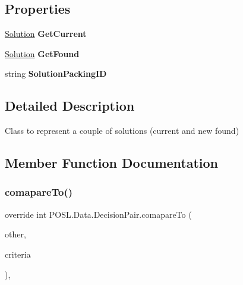 \subsection*{Properties}
\begin{DoxyCompactItemize}
\item 
\mbox{\label{classPOSL_1_1Data_1_1DecisionPair_a7757ed873d87b365b39f7ec3b203b428}} 
\hyperlink{classPOSL_1_1Data_1_1Solution}{Solution} {\bfseries Get\+Current}
\item 
\mbox{\label{classPOSL_1_1Data_1_1DecisionPair_a57e8d7fbe6e4e9ef9371aefd5e061627}} 
\hyperlink{classPOSL_1_1Data_1_1Solution}{Solution} {\bfseries Get\+Found}
\item 
\mbox{\label{classPOSL_1_1Data_1_1DecisionPair_ae5b43d45b945d7c4a5f3fb6433ade45e}} 
string {\bfseries Solution\+Packing\+ID}
\end{DoxyCompactItemize}


\subsection{Detailed Description}
Class to represent a couple of solutions (current and new found) 

\subsection{Member Function Documentation}
\mbox{\label{classPOSL_1_1Data_1_1DecisionPair_a86eb9f86339a60733443d1fd1332913d}} 
\subsubsection{\texorpdfstring{comapare\+To()}{comapareTo()}}
{\footnotesize\ttfamily override int P\+O\+S\+L.\+Data.\+Decision\+Pair.\+comapare\+To (\begin{DoxyParamCaption}\item[{\hyperlink{classPOSL_1_1Data_1_1ComputationData}{Computation\+Data}}]{other,  }\item[{Func$<$ \hyperlink{classPOSL_1_1Data_1_1ComputationData}{Computation\+Data}, int $>$}]{criteria }\end{DoxyParamCaption})\hspace{0.3cm}{\ttfamily [inline]}, {\ttfamily [virtual]}}



